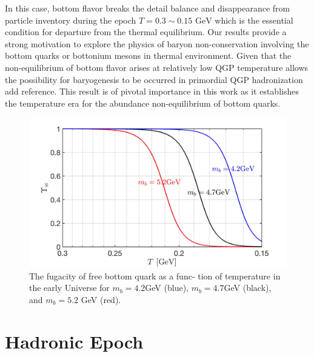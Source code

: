 \documentclass[universe,article,submit,moreauthors,pdftex,a4paper]{Definitions/mdpi}
\newcommand{\GeV}{\text{ GeV}}
\newcommand*{\xblue}{\color{blue}}
\begin{document}
In this case, bottom flavor breaks the detail balance and disappearance from particle inventory during the epoch $T = 0.3 \sim0.15\GeV$ which is the essential condition for departure from the thermal equilibrium. Our results provide a strong motivation to explore the physics of baryon non-conservation involving the bottom quarks or bottonium mesons  in thermal environment. Given that the non-equilibrium of bottom flavor arises at relatively low QGP temperature allows the possibility for baryogenesis to be occurred in primordial QGP hadronization {\xblue add reference}.
This result is of pivotal importance in this work as it establishes the temperature era for the abundance non-equilibrium of bottom quarks.


\begin{figure} %
\centering
\includegraphics[width=\linewidth]{BquarkFugacity_tot.jpg}
\caption{The fugacity of free bottom quark as a func- tion of temperature in the early Universe for $m_b = 4.2$GeV (blue), $m_b = 4.7 $GeV (black), and $m_b = 5.2$ GeV (red). }
\label{UpsilonBottom_fig}
\end{figure}


\section{Hadronic Epoch}\label{sec:Hadrons}
\end{document}
